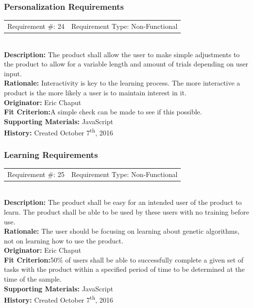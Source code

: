 \documentclass[12pt, titlepage]{article}
\begin{document}
\subsubsection{Personalization Requirements}

\begin{reqbox}
%
\begin{tabular}{cc}
Requirement \#: 24 & Requirement Type: Non-Functional \\
\end{tabular} \\
%
\textbf{Description:} The product shall allow the user to make simple 
adjustments to the product to 
allow for a variable length and amount of trials depending on user input.  \\
\textbf{Rationale:}  Interactivity is key to the learning process. The more 
interactive a product is the more likely a user is to maintain interest in it.\\
\textbf{Originator:} Eric Chaput\\
\textbf{Fit Criterion:}A simple check can be made to see if this possible.\\
%  
\textbf{Supporting Materials:} JavaScript \\
\textbf{History:} Created October 7\textsuperscript{th}, 2016
%
\end{reqbox}

\subsubsection{Learning Requirements}

\begin{reqbox}
%
\begin{tabular}{cc}
Requirement \#: 25 & Requirement Type: Non-Functional \\
\end{tabular} \\
%
\textbf{Description:} The product shall be easy for an intended user of the 
product to learn. The 
product shall be able to be used by these users with no training before use.  \\
\textbf{Rationale:}  The user should be focusing on learning about genetic 
algorithms, not on learning how to use the product.\\
\textbf{Originator:} Eric Chaput\\
\textbf{Fit Criterion:}50\% of users shall be able to successfully complete a 
given 
set of tasks with the product within a specified period of time to be determined 
at the time of the sample.\\
%  
\textbf{Supporting Materials:} JavaScript \\
\textbf{History:} Created October 7\textsuperscript{th}, 2016
%
\end{reqbox}
\end{document}
